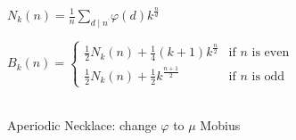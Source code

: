 \begin{large}
  \begin{huge}
    ${\displaystyle N_{k}(n)={\frac {1}{n}}\sum _{d\mid n}\varphi (d)k^{\frac {n}{d}}}$
  \end{huge}
  \hfill
  \begin{Large}
    ${\displaystyle B_{k}(n)={\begin{cases}{\tfrac {1}{2}}N_{k}(n)+{\tfrac {1}{4}}(k+1)k^{\frac {n}{2}}&{\text{if }}n{\text{ is even}}\\[10px]{\tfrac {1}{2}}N_{k}(n)+{\tfrac {1}{2}}k^{\frac {n+1}{2}}&{\text{if }}n{\text{ is odd}}\end{cases}}}$
  \end{Large} \\
  Aperiodic Necklace: change $\varphi$ to $\mu$ Mobius
\end{large}
